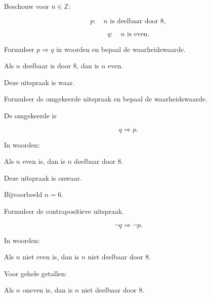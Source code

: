 \documentclass{ximera}
\begin{document}
\begin{oefening}{\oefU\ESS}

Beschouw voor $n\in\mathbb{Z}$:

\[
p:\quad n\text{ is deelbaar door }8,
\]

\[
q:\quad n\text{ is even}.
\]

\begin{question}

Formuleer $p\Rightarrow q$ in woorden en bepaal de waarheidswaarde.

\begin{oplossing}

Als $n$ deelbaar is door $8$, dan is $n$ even.

Deze uitspraak is waar.

\end{oplossing}

\end{question}


\begin{question}

Formuleer de omgekeerde uitspraak en bepaal de waarheidswaarde.

\begin{oplossing}

De omgekeerde is

\[
q\Rightarrow p.
\]

In woorden:

Als $n$ even is, dan is $n$ deelbaar door $8$.

Deze uitspraak is onwaar.

Bijvoorbeeld $n=6$.

\end{oplossing}

\end{question}


\begin{question}

Formuleer de contrapositieve uitspraak.

\begin{oplossing}

\[
\neg q\Rightarrow\neg p.
\]

In woorden:

Als $n$ niet even is, dan is $n$ niet deelbaar door $8$.

Voor gehele getallen:

Als $n$ oneven is, dan is $n$ niet deelbaar door $8$.

\end{oplossing}


\end{question}
\end{oefening}
\end{document}
